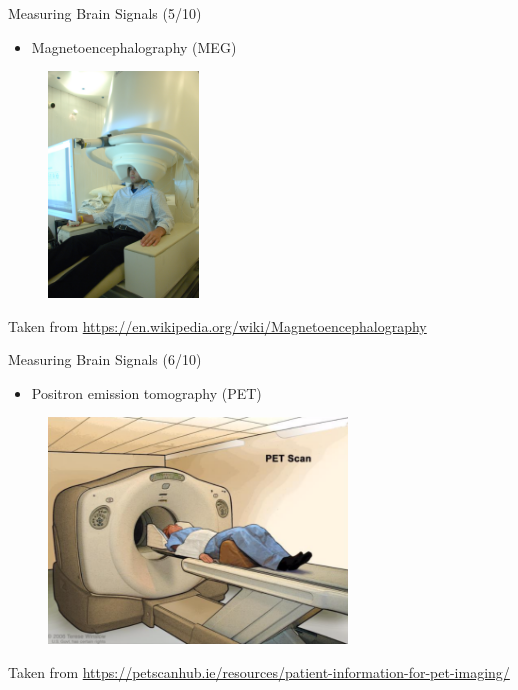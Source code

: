 \documentclass{beamer}
\begin{document}
\begin{frame}
{\centerline{Measuring Brain Signals (5/10)}}
\begin{itemize}
    \item Magnetoencephalography (MEG)
\end{itemize}
\begin{center}

\begin{figure}
    \includegraphics[height=6cm]{P2023.AIBCCSS.BrainSignals/MEG.jpg}
\end{figure}
\end{center}    

\begin{center}
    \tiny{Taken from \url{https://en.wikipedia.org/wiki/Magnetoencephalography}}
\end{center}    
\end{frame}

\begin{frame}
{\centerline{Measuring Brain Signals (6/10)}}
\begin{itemize}
    \item Positron emission tomography (PET)
\end{itemize}
\begin{figure}
    \centering
    \includegraphics[height=6cm]{P2023.AIBCCSS.BrainSignals/pet.png}
\end{figure}
\begin{center}
    \tiny{Taken from \url{https://petscanhub.ie/resources/patient-information-for-pet-imaging/}}
\end{center}    
\end{frame}
\end{document}
